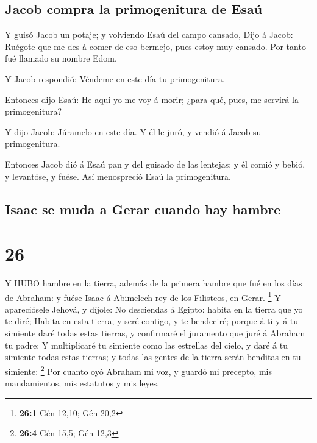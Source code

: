 \hypertarget{jacob-compra-la-primogenitura-de-esauxfa}{%
\subsection{Jacob compra la primogenitura de
Esaú}\label{jacob-compra-la-primogenitura-de-esauxfa}}

 Y guisó Jacob un potaje; y volviendo Esaú del campo
cansado,  Dijo á Jacob: Ruégote que me des á comer de eso
bermejo, pues estoy muy cansado. Por tanto fué llamado su nombre Edom.

 Y Jacob respondió: Véndeme en este día tu primogenitura.

 Entonces dijo Esaú: He aquí yo me voy á morir; ¿para qué,
pues, me servirá la primogenitura?

 Y dijo Jacob: Júramelo en este día. Y él le juró, y vendió
á Jacob su primogenitura.

 Entonces Jacob dió á Esaú pan y del guisado de las
lentejas; y él comió y bebió, y levantóse, y fuése. Así menospreció Esaú
la primogenitura.

\hypertarget{isaac-se-muda-a-gerar-cuando-hay-hambre}{%
\subsection{Isaac se muda a Gerar cuando hay
hambre}\label{isaac-se-muda-a-gerar-cuando-hay-hambre}}

\hypertarget{section-25}{%
\section{26}\label{section-25}}

 Y HUBO hambre en la tierra, además de la primera hambre que
fué en los días de Abraham: y fuése Isaac á Abimelech rey de los
Filisteos, en Gerar. \footnote{\textbf{26:1} Gén 12,10; Gén 20,2}
 Y apareciósele Jehová, y díjole: No desciendas á Egipto:
habita en la tierra que yo te diré;  Habita en esta tierra,
y seré contigo, y te bendeciré; porque á ti y á tu simiente daré todas
estas tierras, y confirmaré el juramento que juré á Abraham tu padre:
 Y multiplicaré tu simiente como las estrellas del cielo, y
daré á tu simiente todas estas tierras; y todas las gentes de la tierra
serán benditas en tu simiente: \footnote{\textbf{26:4} Gén 15,5; Gén
  12,3}  Por cuanto oyó Abraham mi voz, y guardó mi
precepto, mis mandamientos, mis estatutos y mis leyes.

